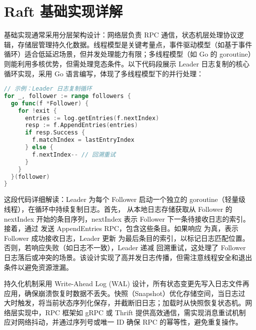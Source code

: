\chapter{Raft 基础实现详解}
基础实现通常采用分层架构设计：网络层负责 RPC 通信，状态机层处理协议逻辑，存储层管理持久化数据。线程模型是关键考量点，事件驱动模型（如基于事件循环）适合低延迟场景，但并发处理能力有限；多线程模型（如 Go 的 goroutine）则能利用多核优势，但需处理竞态条件。以下代码段展示 Leader 日志复制的核心循环实现，采用 Go 语言编写，体现了多线程模型下的并行处理：\par
\begin{lstlisting}[language=go]
// 示例：Leader 日志复制循环
for _, follower := range followers {
  go func(f *Follower) {
    for !exit {
      entries := log.getEntries(f.nextIndex)
      resp := f.AppendEntries(entries)
      if resp.Success {
        f.matchIndex = lastEntryIndex
      } else {
        f.nextIndex-- // 回溯重试
      }
    }
  }(follower)
}
\end{lstlisting}
这段代码详细解读：Leader 为每个 Follower 启动一个独立的 goroutine（轻量级线程），在循环中持续复制日志。首先， 从本地日志存储获取从 Follower 的 nextIndex 开始的条目序列，nextIndex 表示 Follower 下一条待接收日志的索引。接着，通过  发送 AppendEntries RPC，包含这些条目。如果响应  为真，表示 Follower 成功接收日志，Leader 更新  为最后条目的索引，以标记日志匹配位置。否则，若响应失败（如日志不一致），Leader 递减  回溯重试，这处理了 Follower 日志落后或冲突的场景。该设计实现了高并发日志传播，但需注意线程安全和退出条件以避免资源泄漏。\par
持久化机制采用 Write-Ahead Log (WAL) 设计，所有状态变更先写入日志文件再应用，确保崩溃恢复时数据不丢失。快照（Snapshot）优化存储空间，当日志过大时触发，将当前状态序列化保存，并截断旧日志；加载时从快照恢复状态机。网络层实现中，RPC 框架如 gRPC 或 Thrift 提供高效通信，需实现消息重试机制应对网络抖动，并通过序列号或唯一 ID 确保 RPC 的幂等性，避免重复操作。\par
